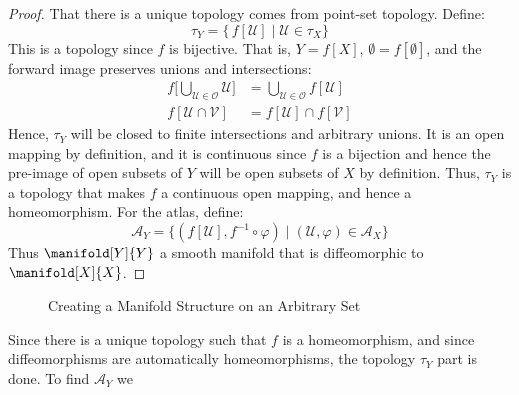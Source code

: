 \documentclass{article}                                                        %
\begin{document}
            \begin{proof}
                That there is a unique topology comes from point-set topology.
                Define:
                \begin{equation}
                    \tau_{Y}=\{\,f[\mathcal{U}]\;|\;\mathcal{U}\in\tau_{X}\}
                \end{equation}
                This is a topology since $f$ is bijective. That is,
                $Y=f[X]$, $\emptyset=f[\emptyset]$, and the forward image
                preserves unions and intersections:
                \begin{align}
                    f\Big[\bigcup_{\mathcal{U}\in\mathcal{O}}\mathcal{U}\Big]
                    &=\bigcup_{\mathcal{U}\in\mathcal{O}}f[\mathcal{U}]\\
                    f[\mathcal{U}\cap\mathcal{V}]
                        &=f[\mathcal{U}]\cap{f}[\mathcal{V}]
                \end{align}
                Hence, $\tau_{Y}$ will be closed to finite intersections and
                arbitrary unions. It is an open mapping by definition, and it is
                continuous since $f$ is a bijection and hence the pre-image of
                open subsets of $Y$ will be open subsets of $X$ by definition.
                Thus, $\tau_{Y}$ is a topology that makes $f$ a continuous open
                mapping, and hence a homeomorphism. For the atlas, define:
                \begin{equation}
                    \mathcal{A}_{Y}=
                        \{(f[\mathcal{U}],f^{\minus{1}}\circ\varphi)
                            \;|\;(\mathcal{U},\varphi)\in\mathcal{A}_{X}\}
                \end{equation}
                Thus $\manifold[Y]{Y}$ a smooth manifold that is
                diffeomorphic to $\manifold[X]{X}$.
            \end{proof}
            \begin{figure}[H]
                \centering
                \captionsetup{type=figure}
                
                \caption{Creating a Manifold Structure on an Arbitrary Set}
                \label{fig:Manifold_Structure_on_Arbitrary_Set}
            \end{figure}
            Since there is a unique topology such that $f$ is a homeomorphism,
            and since diffeomorphisms are automatically homeomorphisms, the
            topology $\tau_{Y}$ part is done. To find $\mathcal{A}_{Y}$ we
\end{document}

